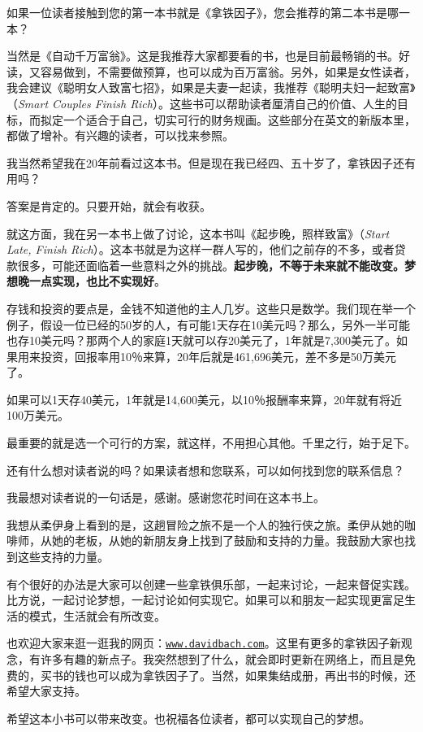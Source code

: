 {\heiti 如果一位读者接触到您的第一本书就是《拿铁因子》，您会推荐的第二本书是哪一本？}\vspace{1em}

当然是《自动千万富翁》。这是我推荐大家都要看的书，也是目前最畅销的书。好读，又容易做到，不需要做预算，也可以成为百万富翁。另外，如果是女性读者，我会建议《聪明女人致富七招》，如果是夫妻一起读，我推荐《聪明夫妇一起致富》（\textit{Smart Couples Finish Rich}）。这些书可以帮助读者厘清自己的价值、人生的目标，而拟定一个适合于自己，切实可行的财务规画。这些部分在英文的新版本里，都做了增补。有兴趣的读者，可以找来参照。

\vspace{2em}

{\heiti 我当然希望我在20年前看过这本书。但是现在我已经四、五十岁了，拿铁因子还有用吗？}\vspace{1em}

答案是肯定的。只要开始，就会有收获。

就这方面，我在另一本书上做了讨论，这本书叫《起步晚，照样致富》（\textit{Start Late, Finish Rich}）。这本书就是为这样一群人写的，他们之前存的不多，或者贷款很多，可能还面临着一些意料之外的挑战。\textbf{起步晚，不等于未来就不能改变。梦想晚一点实现，也比不实现好}。

存钱和投资的要点是，金钱不知道他的主人几岁。这些只是数学。我们现在举一个例子，假设一位已经的50岁的人，有可能1天存在10美元吗？那么，另外一半可能也存10美元吗？那两个人的家庭1天就可以存20美元了，1年就是7,300美元了。如果用来投资，回报率用10％来算，20年后就是461,696美元，差不多是50万美元了。

如果可以1天存40美元，1年就是14,600美元，以10％报酬率来算，20年就有将近100万美元。

最重要的就是选一个可行的方案，就这样，不用担心其他。千里之行，始于足下。

\vspace{2em}

{\heiti 还有什么想对读者说的吗？如果读者想和您联系，可以如何找到您的联系信息？}\vspace{1em}

我最想对读者说的一句话是，感谢。感谢您花时间在这本书上。

我想从柔伊身上看到的是，这趟冒险之旅不是一个人的独行侠之旅。柔伊从她的咖啡师，从她的老板，从她的新朋友身上找到了鼓励和支持的力量。我鼓励大家也找到这些支持的力量。

有个很好的办法是大家可以创建一些拿铁俱乐部，一起来讨论，一起来督促实践。比方说，一起讨论梦想，一起讨论如何实现它。如果可以和朋友一起实现更富足生活的模式，生活就会有所改变。

也欢迎大家来逛一逛我的网页：\href{https://davidbach.com/}{\nolinkurl{www.davidbach.com}}。这里有更多的拿铁因子新观念，有许多有趣的新点子。我突然想到了什么，就会即时更新在网络上，而且是免费的，买书的钱也可以成为拿铁因子了。当然，如果集结成册，再出书的时候，还希望大家支持。

希望这本小书可以带来改变。也祝福各位读者，都可以实现自己的梦想。
